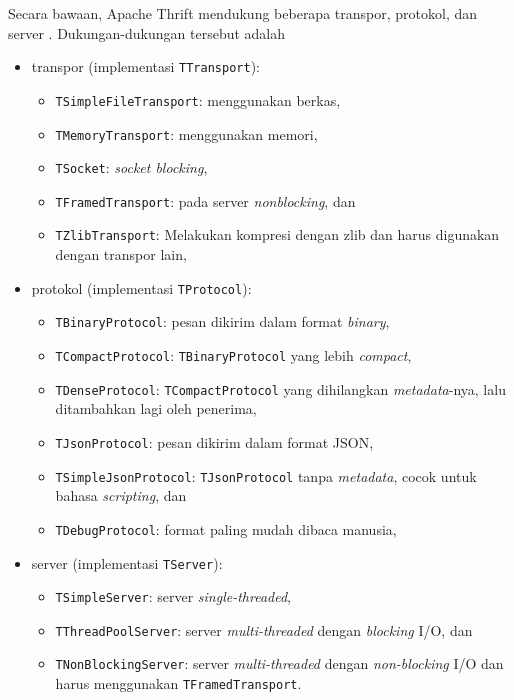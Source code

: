 Secara bawaan, Apache Thrift mendukung beberapa transpor, protokol, dan server
\parencite{prunicki_thrift}. Dukungan-dukungan tersebut adalah
\begin{itemize}
    \item transpor (implementasi \texttt{TTransport}):
          \begin{itemize}
              \item \texttt{TSim\-ple\-FileTrans\-port}: menggunakan berkas,
              \item \texttt{TMe\-mo\-ry\-Trans\-port}: menggunakan memori,
              \item \texttt{T\-Sock\-et}: \textit{socket blocking},
              \item \texttt{TFramed\-Trans\-port}: pada server \textit{nonblocking}, dan
              \item \texttt{T\-Z\-lib\-Trans\-port}: Melakukan kompresi dengan
                    zlib dan harus digunakan dengan trans\-por lain,
          \end{itemize}
    \item protokol (implementasi \texttt{TProtocol}):
          \begin{itemize}
              \item \texttt{TBinaryProtocol}: pesan dikirim dalam format
                    \textit{binary},
              \item \texttt{TCompactProtocol}: \texttt{TBinaryProtocol} yang
                    lebih \textit{compact},
              \item \texttt{TDenseProtocol}: \texttt{TCompactProtocol} yang
                    dihilangkan \textit{me\-ta\-da\-ta}\--nya, lalu ditambahkan lagi oleh
                    penerima,
              \item \texttt{TJsonProtocol}: pesan dikirim dalam format JSON,
              \item \texttt{TSimpleJsonProtocol}: \texttt{TJsonProtocol} tanpa
                    \textit{metadata}, cocok untuk bahasa \textit{scripting}, dan
              \item \texttt{TDebugProtocol}: format paling mudah dibaca manusia,
          \end{itemize}
    \item server (implementasi \texttt{TServer}):
          \begin{itemize}
              \item \texttt{TSimpleServer}: server \textit{single-threaded},
              \item \texttt{TThreadPoolServer}: server \textit{multi-threaded}
                    dengan \textit{blocking} I/O, dan
              \item \texttt{TNonBlockingServer}: server \textit{multi-threaded}
                    dengan \textit{non-blocking} I/O dan harus menggunakan
                    \texttt{TFramedTransport}.
          \end{itemize}
\end{itemize}


